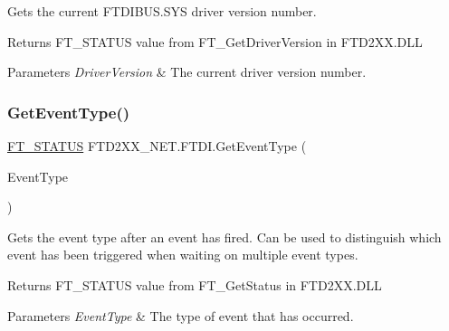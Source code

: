 Gets the current F\+T\+D\+I\+B\+U\+S.\+S\+YS driver version number. 

\begin{DoxyReturn}{Returns}
F\+T\+\_\+\+S\+T\+A\+T\+US value from F\+T\+\_\+\+Get\+Driver\+Version in F\+T\+D2\+X\+X.\+D\+LL
\end{DoxyReturn}

\begin{DoxyParams}{Parameters}
{\em Driver\+Version} & The current driver version number.\\
\hline
\end{DoxyParams}
\mbox{\label{class_f_t_d2_x_x___n_e_t_1_1_f_t_d_i_a140b361e7379ab93e5ae6bc86c318fdd}} 
\subsubsection{\texorpdfstring{GetEventType()}{GetEventType()}}
{\footnotesize\ttfamily \mbox{\hyperlink{class_f_t_d2_x_x___n_e_t_1_1_f_t_d_i_aabe20ad905cc4ccc1e35dd5b877d9a83}{F\+T\+\_\+\+S\+T\+A\+T\+US}} F\+T\+D2\+X\+X\+\_\+\+N\+E\+T.\+F\+T\+D\+I.\+Get\+Event\+Type (\begin{DoxyParamCaption}\item[{ref U\+Int32}]{Event\+Type }\end{DoxyParamCaption})}



Gets the event type after an event has fired. Can be used to distinguish which event has been triggered when waiting on multiple event types. 

\begin{DoxyReturn}{Returns}
F\+T\+\_\+\+S\+T\+A\+T\+US value from F\+T\+\_\+\+Get\+Status in F\+T\+D2\+X\+X.\+D\+LL
\end{DoxyReturn}

\begin{DoxyParams}{Parameters}
{\em Event\+Type} & The type of event that has occurred.\\
\hline
\end{DoxyParams}
\mbox{\label{class_f_t_d2_x_x___n_e_t_1_1_f_t_d_i_a23f37b06cc5e7b2a6c9d2fec2a0135cc}} 
